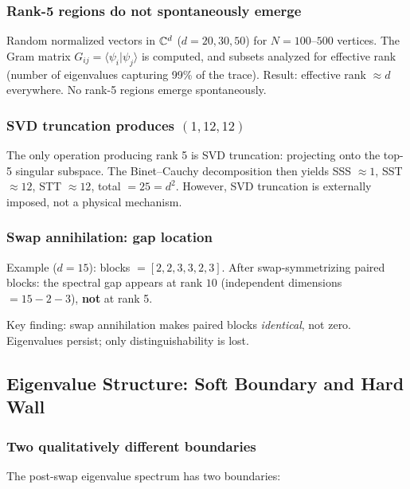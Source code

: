 \subsubsection{Rank-5 regions do not spontaneously emerge}

Random normalized vectors in $\mathbb{C}^d$ ($d = 20, 30, 50$) for $N = 100$--$500$ vertices. The Gram matrix $G_{ij} = \langle\psi_i|\psi_j\rangle$ is computed, and subsets analyzed for effective rank (number of eigenvalues capturing 99\% of the trace). Result: effective rank $\approx d$ everywhere. No rank-5 regions emerge spontaneously.

\subsubsection{SVD truncation produces $(1, 12, 12)$}

The only operation producing rank 5 is SVD truncation: projecting onto the top-5 singular subspace. The Binet--Cauchy decomposition then yields SSS $\approx 1$, SST $\approx 12$, STT $\approx 12$, total $= 25 = d^2$. However, SVD truncation is externally imposed, not a physical mechanism.

\subsubsection{Swap annihilation: gap location}

Example ($d=15$): blocks $= [2, 2, 3, 3, 2, 3]$. After swap-symmetrizing paired blocks: the spectral gap appears at rank $10$ (independent dimensions $= 15 - 2 - 3$), \textbf{not} at rank 5.

Key finding: swap annihilation makes paired blocks \emph{identical}, not zero. Eigenvalues persist; only distinguishability is lost.

\subsection{Eigenvalue Structure: Soft Boundary and Hard Wall}

\subsubsection{Two qualitatively different boundaries}

The post-swap eigenvalue spectrum has two boundaries:

